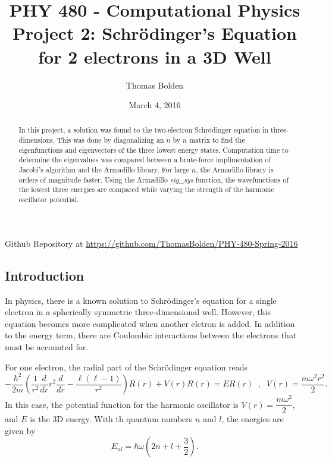 \documentclass[11pt]{article}
\title{PHY 480 - Computational Physics \\ Project 2: Schr\"{o}dinger's Equation for 2 electrons in a 3D Well}
\author{Thomas Bolden}
\date{March 4, 2016}
\begin{document}
\maketitle

\thispagestyle{empty}

\centerline{Github Repository at \href{https://github.com/ThomasBolden/PHY-480-Spring-2016}{https://github.com/ThomasBolden/PHY-480-Spring-2016}}

\begin{abstract}

    In this project, a solution was found to the two-electron Schr\"{o}dinger equation in three-dimensions. This was done by diagonalizing an $n$ by $n$ matrix to find the eigenfunctions and eigenvectors of the three lowest energy states. Computation time to determine the eigenvalues was compared between a brute-force implimentation of Jacobi's algorithm and the Armadillo library. For large $n$, the Armadillo library is orders of magnitude faster. Using the Armadillo {\em eig\_sys} function, the wavefunctions of the lowest three energies are compared while varying the strength of the harmonic oscillator potential.

\end{abstract}

\vfill

\tableofcontents

\vspace{3cm}

\pagebreak

\subsection{Introduction}

    In physics, there is a known solution to Schr\"{o}dinger's equation for a single electron in a spherically symmetric three-dimensional well. However, this equation becomes more complicated when another elctron is added. In addition to the energy term, there are Coulombic interactions between the electrons that must be accounted for. 

    For one electron, the radial part of the Schr\"{o}dinger equation reads
    \[ -\dfrac{\hbar^2}{2m} \left( \dfrac{1}{r^2} \dfrac{d}{dr}r^2\dfrac{d}{dr} - \dfrac{\ell (\ell -1)}{r^2} \right) R(r) + V(r) R(r) = E R(r) \;\; , \;\; V(r) = \dfrac{m\omega^2 r^2}{2}. \]
    In this case, the potential function for the harmonic oscillator is $V(r) = \dfrac{m\omega^2}{2}$, and $E$ is the 3D energy. With th quantum numbers $n$ and $l$, the energies are given by
    \[ E_{nl} = \hbar \omega \left( 2n+l+\dfrac{3}{2} \right). \]
\end{document}
